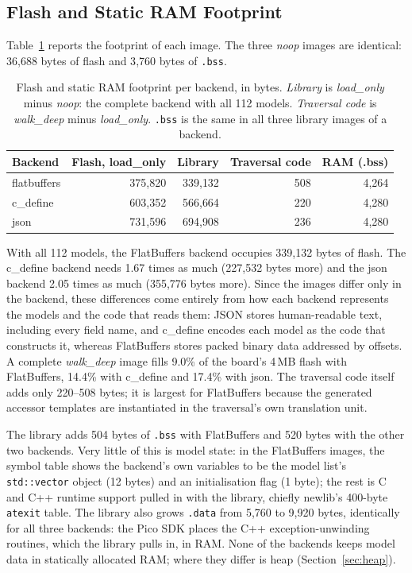 \documentclass{article}
\begin{document}
\subsection{Flash and Static RAM Footprint}
\label{sec:footprint}
Table~\ref{tab:footprint} reports the footprint of each image. The three \textit{noop} images are identical: 36{,}688 bytes of flash and 3{,}760 bytes of \texttt{.bss}.

\begin{table}[h]
\centering
\begin{tabular}{|l|r|r|r|r|}
\hline
\textbf{Backend} & \textbf{Flash, load\_only} & \textbf{Library} & \textbf{Traversal code} & \textbf{RAM (.bss)} \\
\hline
flatbuffers & 375{,}820 & 339{,}132 & 508 & 4{,}264 \\
c\_define   & 603{,}352 & 566{,}664 & 220 & 4{,}280 \\
json        & 731{,}596 & 694{,}908 & 236 & 4{,}280 \\
\hline
\end{tabular}
\caption{Flash and static RAM footprint per backend, in bytes. \textit{Library} is \textit{load\_only} minus \textit{noop}: the complete backend with all 112 models. \textit{Traversal code} is \textit{walk\_deep} minus \textit{load\_only}. \texttt{.bss} is the same in all three library images of a backend.}
\label{tab:footprint}
\end{table}

With all 112 models, the FlatBuffers backend occupies 339{,}132 bytes of flash. The c\_define backend needs 1.67 times as much (227{,}532 bytes more) and the json backend 2.05 times as much (355{,}776 bytes more). Since the images differ only in the backend, these differences come entirely from how each backend represents the models and the code that reads them: JSON stores human-readable text, including every field name, and c\_define encodes each model as the code that constructs it, whereas FlatBuffers stores packed binary data addressed by offsets. A complete \textit{walk\_deep} image fills 9.0\% of the board's 4\,MB flash with FlatBuffers, 14.4\% with c\_define and 17.4\% with json. The traversal code itself adds only 220--508 bytes; it is largest for FlatBuffers because the generated accessor templates are instantiated in the traversal's own translation unit.

The library adds 504 bytes of \texttt{.bss} with FlatBuffers and 520 bytes with the other two backends. Very little of this is model state: in the FlatBuffers images, the symbol table shows the backend's own variables to be the model list's \texttt{std::vector} object (12 bytes) and an initialisation flag (1 byte); the rest is C and C++ runtime support pulled in with the library, chiefly newlib's 400-byte \texttt{atexit} table. The library also grows \texttt{.data} from 5{,}760 to 9{,}920 bytes, identically for all three backends: the Pico SDK places the C++ exception-unwinding routines, which the library pulls in, in RAM. None of the backends keeps model data in statically allocated RAM; where they differ is heap (Section~\ref{sec:heap}).
\end{document}
